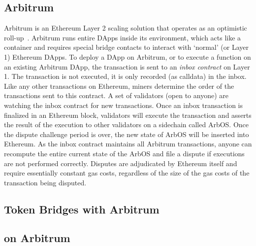 

\subsection{Arbitrum}

Arbitrum is an Ethereum Layer 2 scaling solution that operates as an optimistic roll-up~\cite{kalodner2018arbitrum}. Arbitrum runs entire DApps inside its environment, which acts like a container and requires special bridge contacts to interact with `normal' (or Layer 1) Ethereum DApps. To deploy a DApp on Arbitrum, or to execute a function on an existing Arbitrum DApp, the transaction is sent to an \textit{inbox contract} on Layer 1. The transaction is not executed, it is only recorded (as calldata) in the inbox. Like any other transactions on Ethereum, miners determine the order of the transactions sent to this contract. A set of validators (open to anyone) are watching the inbox contract for new transactions. Once an inbox transaction is finalized in an Ethereum block, validators will execute the transaction and asserts the result of the execution to other validators on a sidechain called ArbOS. Once the dispute challenge period is over, the new state of ArbOS will be inserted into Ethereum. As the inbox contract maintains all Arbitrum transactions, anyone can recompute the entire current state of the ArbOS and file a dispute if executions are not performed correctly. Disputes are adjudicated by Ethereum itself and require essentially constant gas costs, regardless of the size of the gas costs of the transaction being disputed.  

\subsection{Token Bridges with Arbitrum}


\subsection{\cm on Arbitrum}

